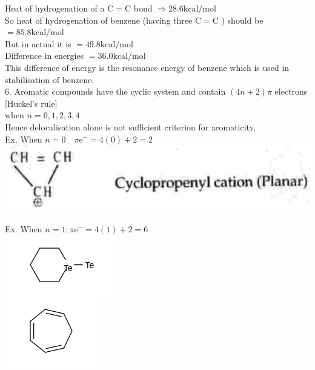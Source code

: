 \documentclass[10pt]{article}
\begin{document}
Heat of hydrogenation of a $\mathrm{C}=\mathrm{C}$ bond $\Rightarrow 28.6 \mathrm{kcal} / \mathrm{mol}$\\
So heat of hydrogenation of benzene (having three $\mathrm{C}=\mathrm{C}$ ) should be $=85.8 \mathrm{kcal} / \mathrm{mol}$\\
But in actual it is $=49.8 \mathrm{kcal} / \mathrm{mol}$\\
Difference in energies $=36.0 \mathrm{kcal} / \mathrm{mol}$\\
This difference of energy is the resonance energy of benzene which is used in stabilisation of benzene.\\
6. Aromatic compounds have the cyclic system and contain $(4 n+2) \pi$ electrons [Huckel's rule]\\
when $n=0,1,2,3,4$ $\qquad$\\
Hence delocalisation alone is not sufficient criterion for aromaticity,\\
Ex. When $n=0 \quad \pi \mathrm{e}^{-}=4(0)+2=2$\\
\includegraphics[max width=\textwidth, center]{2025_01_28_8470952b98110cec3aabg-201(1)}

Ex. When $n=1 ; \pi \mathrm{e}^{-}=4(1)+2=6$\\
\includegraphics{smile-51fdae8d17b8dd13b951efebd3044c907579d5da}\\
\includegraphics{smile-6e5e5bffe140799c7ba34094203e968b80bbcccf}
\end{document}
